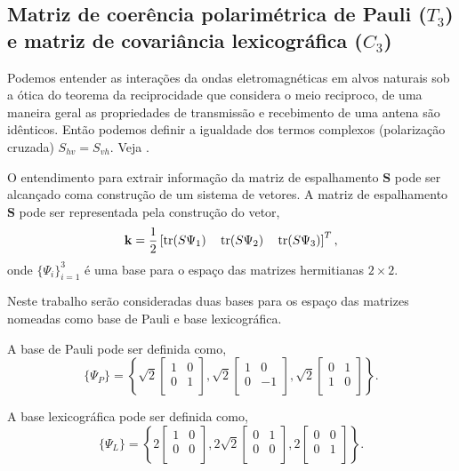 \subsection{Matriz de coerência polarimétrica de Pauli ($T_3$) e matriz de covariância lexicográfica ($C_3$)}

Podemos entender as interações da ondas eletromagnéticas em alvos naturais sob a ótica do teorema da reciprocidade que considera o meio reciproco, de uma maneira geral as propriedades de transmissão e recebimento de uma antena são idênticos. Então podemos definir a igualdade dos termos complexos (polarização cruzada) $S_{hv}=S_{vh}$.  Veja \citet{lp}. 

O entendimento para extrair informação da matriz de espalhamento $\mathbf{S}$ pode ser alcançado coma construção de um sistema de vetores. A matriz de espalhamento $\mathbf{S}$ pode ser representada pela construção do vetor,
\begin{equation}\label{def_vet_espalhamento_3d}
\mathbf{k}=\frac{1}{2}\left[\operatorname{tr}(S\Psi_1)\quad\operatorname{tr}(S\Psi_2)\quad \operatorname{tr}(S\Psi_3)\right]^T,
\end{equation}
onde $\{\Psi_i\}_{i=1}^3$ é uma base para o espaço das matrizes hermitianas $2\times 2$.

Neste trabalho serão consideradas duas bases para os espaço das matrizes nomeadas como base de Pauli e base lexicográfica.	

A base de Pauli pode ser definida como,
\begin{equation}\label{base_de_pauli_3d}
\{\Psi_P\} = \left\{
\sqrt{2}\left[\begin{array}{cc}
	1  & 0  \\
	0  & 1 \\
\end{array}\right],
\sqrt{2}\left[\begin{array}{cc}
	1  & 0  \\
	0  & -1  \\
\end{array}\right],
\sqrt{2}\left[\begin{array}{cc}
	0  & 1  \\
	1  & 0  \\
\end{array}\right]
\right\}.
\end{equation}

A base lexicográfica pode ser definida como,
\begin{equation}\label{base_de_lexicografica_3d}
\{\Psi_L\} = \left\{
2\left[\begin{array}{cc}
	1  & 0  \\
	0  & 0 \\
\end{array}\right],
2\sqrt{2}\left[\begin{array}{cc}
	0  & 1  \\
	0  & 0  \\
\end{array}\right],
2\left[\begin{array}{cc}
	0  & 0  \\
	0  & 1  \\
\end{array}\right]
\right\}.
\end{equation}

